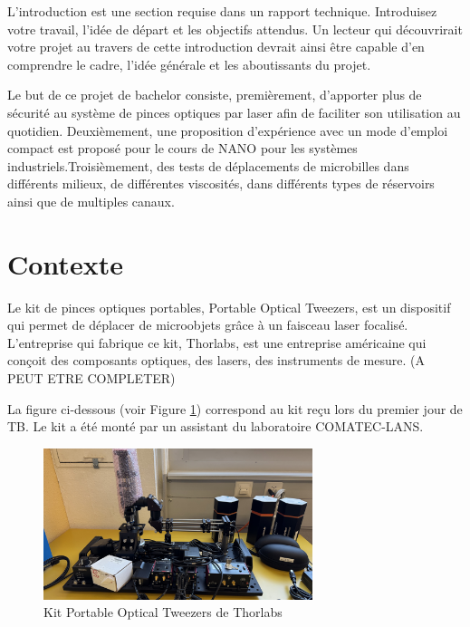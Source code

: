 L'introduction est une section requise dans un rapport technique. Introduisez votre travail, l'idée de départ et les objectifs attendus. Un lecteur qui découvrirait votre projet au travers de cette introduction devrait ainsi être capable d'en comprendre le cadre, l'idée générale et les aboutissants du projet.

Le but de ce projet de bachelor consiste, premièrement, d'apporter plus de sécurité au système de pinces optiques par laser afin de faciliter son utilisation au quotidien. Deuxièmement, une proposition d'expérience avec un mode d'emploi compact est proposé pour le cours de NANO pour les systèmes industriels.Troisièmement, des tests de déplacements de microbilles dans différents milieux, de différentes viscosités, dans différents types de réservoirs ainsi que de multiples canaux.

\section{Contexte}

Le kit de pinces optiques portables, Portable Optical Tweezers, est un dispositif qui permet de déplacer de microobjets grâce à un faisceau laser focalisé. L'entreprise qui fabrique ce kit, Thorlabs, est une entreprise américaine qui conçoit des composants optiques, des lasers, des instruments de mesure. (A PEUT ETRE COMPLETER)

La figure ci-dessous (voir Figure \ref{kit_vierge}) correspond au kit reçu lors du premier jour de TB. Le kit a été monté par un assistant du laboratoire COMATEC-LANS.

\begin{figure}[H]
    \begin{center}
        \includegraphics[width=0.7\textwidth]{assets/figures/figures_introduction/kit_vierge.jpeg}
    \end{center}
    \caption{Kit Portable Optical Tweezers de Thorlabs}
    \label{kit_vierge}
\end{figure}

